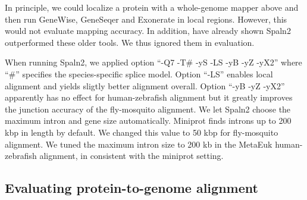 \documentclass{bioinfo}
\begin{document}
In principle, we could localize a protein with a whole-genome mapper above and
then run GeneWise, GeneSeqer and Exonerate in local regions. However, this
would not evaluate mapping accuracy. In addition, \citet{Iwata:2012aa} have
already shown Spaln2 outperformed these older tools. We thus ignored them in
evaluation.

When running Spaln2, we applied option ``-Q7 -T\# -yS -LS -yB -yZ -yX2'' where
``\#'' specifies the species-specific splice model. Option ``-LS'' enables
local alignment and yields sligtly better alignment overall. Option ``-yB -yZ
-yX2'' apparently has no effect for human-zebrafish alignment but it greatly
improves the junction accuracy of the fly-mosquito alignment. We let Spaln2
choose the maximum intron and gene size automatically. Miniprot finds introns
up to 200 kbp in length by default. We changed this value to 50 kbp for
fly-mosquito alignment. We tuned the maximum intron size to 200 kb in the
MetaEuk human-zebrafish alignment, in consistent with the miniprot setting.

\subsection{Evaluating protein-to-genome alignment}
\end{document}

